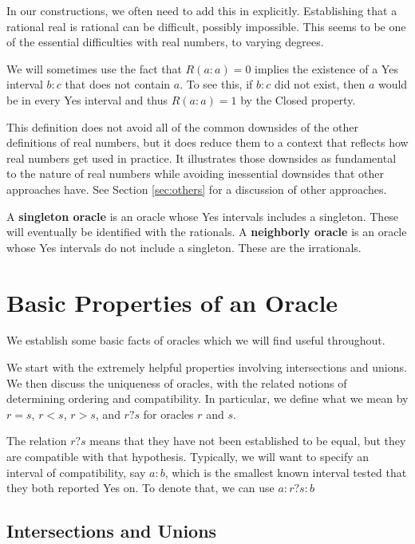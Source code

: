 \documentclass[12pt]{article}
\begin{document}
\begin{enumerate}
    In our constructions, we often need to add this in explicitly. Establishing that a rational real is rational can be difficult, possibly impossible. This seems to be one of the essential difficulties with real numbers, to varying degrees.

    We will sometimes use the fact that $R(a:a)=0$ implies the existence of a Yes interval $b:c$ that does not contain $a$. To see this, if $b:c$ did not exist, then $a$ would be in every Yes interval and thus $R(a:a)=1$ by the Closed property. 

\end{enumerate}



This definition does not avoid all of the common downsides of the other definitions of real numbers, but it does reduce them to a context that reflects how real numbers get used in practice. It illustrates those downsides as fundamental to the nature of real numbers while avoiding inessential downsides that other approaches have. See Section \ref{sec:others} for a discussion of other approaches.  

A \textbf{singleton oracle }is an oracle whose Yes intervals includes a singleton. These will eventually be identified with the rationals. A \textbf{neighborly oracle} is an oracle whose Yes intervals do not include a singleton. These are the irrationals. 



\section{Basic Properties of an Oracle}

We establish some basic facts of oracles which we will find useful throughout. 

We start with the extremely helpful properties involving intersections and unions. We then discuss the uniqueness of oracles, with the related notions of determining ordering and compatibility. In particular, we define what we mean by $r = s$, $r<s$, $r>s$, and $r?s$ for oracles $r$ and $s$. 

The relation $r?s$ means that they have not been established to be equal, but they are compatible with that hypothesis. Typically, we will want to specify an interval of compatibility, say $a:b$, which is the smallest known interval tested that they both reported Yes on. To denote that, we can use $a:r?s:b$ 

\subsection{Intersections and Unions}
\end{document}
